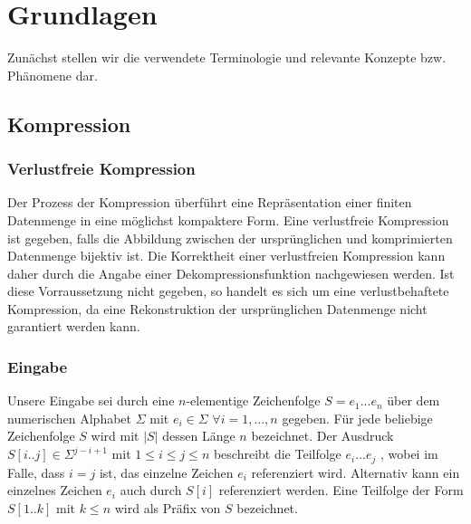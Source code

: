 \chapter{Grundlagen}

Zunächst stellen wir die verwendete Terminologie und relevante Konzepte bzw. Phänomene dar.

\section{Kompression} \label{comp}

\subsection{Verlustfreie Kompression}
Der Prozess der Kompression überführt eine Repräsentation einer finiten Datenmenge in eine möglichst kompaktere Form. Eine verlustfreie Kompression ist gegeben, falls die Abbildung
zwischen der ursprünglichen und komprimierten Datenmenge bijektiv ist. Die Korrektheit einer verlustfreien Kompression kann daher durch die Angabe einer Dekompressionsfunktion 
nachgewiesen werden. Ist diese Vorraussetzung nicht gegeben, so handelt es sich um eine verlustbehaftete Kompression, da eine Rekonstruktion der ursprünglichen Datenmenge nicht 
garantiert werden kann.

\subsection{Eingabe}
Unsere Eingabe sei durch eine $n$-elementige Zeichenfolge $S=e_1...e_n$ über dem numerischen Alphabet $\Sigma$ mit $e_i\in \Sigma$ $\forall i=1,...,n$ gegeben. Für jede
beliebige Zeichenfolge $S$ wird mit $|S|$ dessen Länge $n$ bezeichnet. Der Ausdruck $S[i..j]\in \Sigma^{j-i+1}$ mit $1\leq i\leq j\leq n$ beschreibt die Teilfolge $e_i...e_j$ ,
wobei im Falle, dass $i=j$ ist, das einzelne Zeichen $e_i$ referenziert wird. Alternativ kann ein einzelnes Zeichen $e_i$ auch durch $S[i]$ referenziert werden. Eine Teilfolge 
der Form $S[1..k]$ mit $k\leq n$ wird als Präfix von $S$ bezeichnet.

